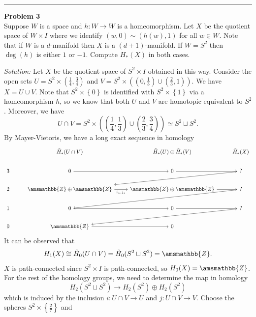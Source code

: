 \documentclass[a4paper, 12pt]{article}
\newenvironment{problem}[2][Problem]
    { \begin{mdframed}[backgroundcolor=gray!20] \textbf{#1 #2} \\}
    {  \end{mdframed}}
\newenvironment{solution}
    {\textit{Solution:}}
    {}
\renewcommand{\mathbb}{\amsmathbb}
\begin{document}
\noindent\rule{7in}{2.8pt}
\begin{problem}{3}
Suppose \(W\) is a space and \(h:W\rightarrow W\) is a homeomorphism. Let \(X\) be the quotient space of \(W\times I\) where we identify \((w,0)\sim (h(w),1)\) for all \(w\in W\). Note that 
if \(W\) is a \(d\)-manifold then \(X\) is a \((d+1)\)-manifold. If \(W=S^2\) then \(\deg(h)\) is either \(1\) or \(-1\). Compute \(H_*(X)\) in both cases. 
\end{problem}
\begin{solution}
Let \(X\) be the quotient space of \(S^2\times I\) obtained in this way. Consider the open sets \(U=S^2\times (\frac{1}{4},\frac{3}{4})\) and \(V=S^2\times ((0,\frac{1}{3})\cup (\frac{2}{3},1))\). We have \(X=U\cup V\). Note that \(S^2\times \left\{ 0 \right\}\) is identified with 
\(S^2\times \left\{ 1 \right\}\) via a homeomorphism \(h\), so we know that both \(U\) and \(V\) are homotopic equivalent to \(S^2\). Moreover, we have 
\[U\cap V=S^2\times ((\frac{1}{4},\frac{1}{3})\cup(\frac{2}{3},\frac{3}{4}))\simeq S^2\sqcup S^2.\]
By Mayer-Vietoris, we have a long exact sequence in homology 
\[\begin{tikzcd}
	& {\tilde{H}_*(U\cap V)} & {\tilde{H}_*(U)\oplus \tilde{H}_*(V)} & {\tilde{H}_*(X)} \\
	3 & 0 & 0 & {?} \\
	2 & {\mathbb{Z}\oplus\mathbb{Z}} & {\mathbb{Z}\oplus\mathbb{Z}} & {?} \\
	1 & 0 & 0 & {?} \\
	0 & {\mathbb{Z}} & 0
	\arrow[from=2-2, to=2-3]
	\arrow[from=2-3, to=2-4]
	\arrow[from=2-4, to=3-2]
	\arrow["{i_*,j_*}"', from=3-2, to=3-3]
	\arrow[from=3-3, to=3-4]
	\arrow[from=3-4, to=4-2]
	\arrow[from=4-2, to=4-3]
	\arrow[from=4-3, to=4-4]
	\arrow[from=4-4, to=5-2]
	\arrow[from=5-2, to=5-3]
\end{tikzcd}\]
It can be observed that 
\[H_1(X)\cong \tilde{H}_0(U\cap V)=\tilde{H}_0(S^2\sqcup S^2)=\mathbb{Z}.\]
\(X\) is path-connected since \(S^2\times I\) is path-connected, so \(H_0(X)=\mathbb{Z}\). For the rest of the homology groups, we need to determine the map in homology 
\[H_2(S^2\sqcup S^2)\rightarrow H_2(S^2)\oplus H_2(S^2)\]
which is induced by the inclusion \(i:U\cap V\rightarrow U\) and \(j:U\cap V\rightarrow V\). Choose the spheres \(S^2\times \left\{ \frac{2}{7} \right\}\) and 

\end{solution}
\end{document}
